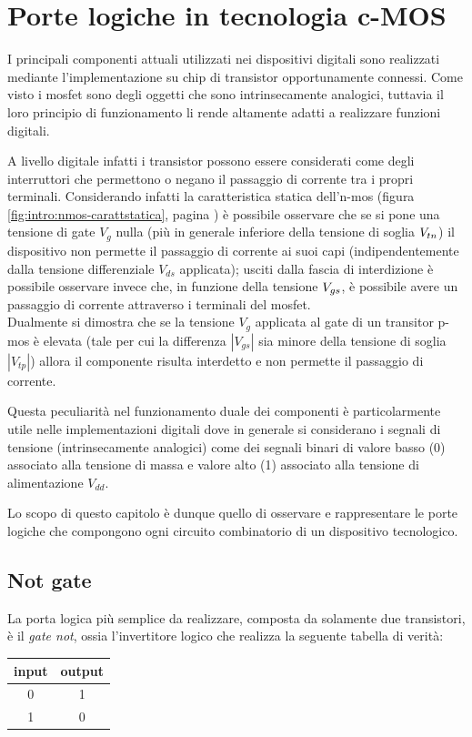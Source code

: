 \chapter{Porte logiche in tecnologia c-MOS}
	
	I principali componenti attuali utilizzati nei dispositivi digitali sono realizzati mediante l'implementazione su chip di transistor opportunamente connessi. Come visto i mosfet sono degli oggetti che sono intrinsecamente analogici, tuttavia il loro principio di funzionamento li rende altamente adatti a realizzare funzioni digitali.
	
	A livello digitale infatti i transistor possono essere considerati come degli interruttori che permettono o negano il passaggio di corrente tra i propri terminali. Considerando infatti la caratteristica statica dell'n-mos (figura \ref{fig:intro:nmos-carattstatica}, pagina \pageref{fig:intro:nmos-carattstatica}) è possibile osservare che se si pone una tensione di gate $V_g$ nulla (più in generale inferiore della tensione di soglia $V_{tn}$) il dispositivo non permette il passaggio di corrente ai suoi capi (indipendentemente dalla tensione differenziale $V_{ds}$ applicata); usciti dalla fascia di interdizione è possibile osservare invece che, in funzione della tensione $V_{gs}$, è possibile avere un passaggio di corrente attraverso i terminali del mosfet.\\
	Dualmente si dimostra che se la tensione $V_g$ applicata al gate di un transitor p-mos è elevata (tale per cui la differenza $|V_{gs}|$ sia minore della tensione di soglia $|V_{tp}|$) allora il componente risulta interdetto e non permette il passaggio di corrente.
	
	Questa peculiarità nel funzionamento duale dei componenti è particolarmente utile nelle implementazioni digitali dove in generale si considerano i segnali di tensione (intrinsecamente analogici) come dei segnali binari di valore basso (0) associato alla tensione di massa e valore alto (1) associato alla tensione di alimentazione $V_{dd}$.
	
	Lo scopo di questo capitolo è dunque quello di osservare e rappresentare le porte logiche che compongono ogni circuito combinatorio di un dispositivo tecnologico.

\section{Not gate}
	
	La porta logica più semplice da realizzare, composta da solamente due transistori, è il \textit{gate not}, ossia l'invertitore logico che realizza la seguente tabella di verità:
	\begin{center}
	\begin{tabular}{c | c}
			input & output \\ \hline
			0 & 1 \\ 1 & 0
	\end{tabular}
	\end{center}
	
